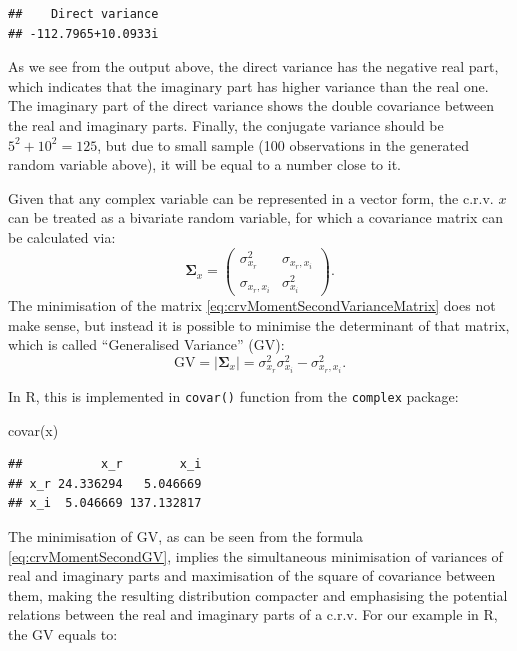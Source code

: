 \documentclass[
]{book}
\newenvironment{Shaded}{\begin{snugshade}}{\end{snugshade}}
\newcommand{\FunctionTok}[1]{\textcolor[rgb]{0.00,0.00,0.00}{#1}}
\newcommand{\NormalTok}[1]{#1}
\begin{document}
\begin{verbatim}
##    Direct variance 
## -112.7965+10.0933i
\end{verbatim}

As we see from the output above, the direct variance has the negative real part, which indicates that the imaginary part has higher variance than the real one. The imaginary part of the direct variance shows the double covariance between the real and imaginary parts. Finally, the conjugate variance should be \(5^2 + 10^2 = 125\), but due to small sample (100 observations in the generated random variable above), it will be equal to a number close to it.

Given that any complex variable can be represented in a vector form, the c.r.v. \(x\) can be treated as a bivariate random variable, for which a covariance matrix can be calculated via:
\begin{equation}
    \boldsymbol{\Sigma}_x = \begin{pmatrix} \sigma_{x_r}^2 & \sigma_{x_r, x_i} \\ \sigma_{x_r, x_i} & \sigma_{x_i}^2 \end{pmatrix} .
    \label{eq:crvMomentSecondVarianceMatrix}
\end{equation}
The minimisation of the matrix \eqref{eq:crvMomentSecondVarianceMatrix} does not make sense, but instead it is possible to minimise the determinant of that matrix, which is called ``Generalised Variance'' (GV):
\begin{equation}
    \mathrm{GV} = |\boldsymbol{\Sigma}_x| = \sigma_{x_r}^2 \sigma_{x_i}^2 - \sigma_{x_r, x_i}^2 .
    \label{eq:crvMomentSecondGV}
\end{equation}

In R, this is implemented in \texttt{covar()} function from the \texttt{complex} package:

\begin{Shaded}
\begin{Highlighting}[]
\FunctionTok{covar}\NormalTok{(x)}
\end{Highlighting}
\end{Shaded}

\begin{verbatim}
##           x_r        x_i
## x_r 24.336294   5.046669
## x_i  5.046669 137.132817
\end{verbatim}

The minimisation of GV, as can be seen from the formula \eqref{eq:crvMomentSecondGV}, implies the simultaneous minimisation of variances of real and imaginary parts and maximisation of the square of covariance between them, making the resulting distribution compacter and emphasising the potential relations between the real and imaginary parts of a c.r.v. For our example in R, the GV equals to:
\end{document}
